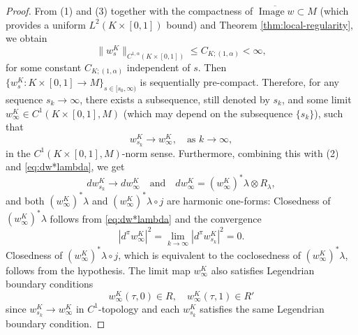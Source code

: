 \documentclass[reqno]{amsart}
\theoremstyle{theorem}
\theoremstyle{definition}
\numberwithin{equation}{section}
\def\Image{\operatorname{Image}}
\begin{document}
\begin{proof}
From (1) and (3) together with the compactness of $\overline{\Image w} \subset M$
(which provides a uniform $L^2(K\times [0,1])$ bound)
and Theorem \ref{thm:local-regularity}, we obtain
$$
\|w^K_s\|_{C^{1,\alpha}(K\times [0,1])}\leq C_{K;(1,\alpha)}<\infty,
$$
for some constant $C_{K;(1,\alpha)}$ independent of $s$.
Then
 $\{w^K_s:K\times [0,1]\to M\}_{s\in [s_0, \infty)}$ is sequentially pre-compact.
Therefore, for any sequence $s_k \to \infty$, there exists a subsequence, still denoted by $s_k$,
and some limit $w^K_\infty\in C^{1}(K\times [0,1], M)$ (which may depend on the subsequence $\{s_k\}$), such that
$$
w^K_{s_k}\to w^K_{\infty}, \quad \text {as } k\to \infty,
$$
in the $C^{1}(K\times [0,1], M)$-norm sense.
Furthermore, combining this with (2) and \eqref{eq:dw*lambda}, we get
$$
dw^K_{s_k}\to dw^K_{\infty} \quad \text{and} \quad dw^K_\infty=(w^K_\infty)^*\lambda\otimes R_\lambda,
$$
and both $(w^K_\infty)^*\lambda$ and $(w^K_\infty)^*\lambda\circ j$ are harmonic one-forms: Closedness of
$(w^K_\infty)^*\lambda$ follows from \eqref{eq:dw*lambda} and the convergence
$$
|d^\pi w^K_\infty|^2 = \lim_{k \to \infty}|d^\pi w^K_{s_k}|^2 = 0.
$$
Closedness of $(w^K_\infty)^*\lambda\circ j$, which is equivalent to the coclosedness of $(w^K_\infty)^*\lambda$,
follows from the hypothesis. The limit map $w_\infty^K$ also satisfies
Legendrian boundary conditions
$$
w_\infty^K(\tau,0) \in R, \quad w_\infty^K(\tau,1) \in R'
$$
since $w^K_{s_k} \to w^K_\infty$ in $C^1$-topology and each $w^K_{s_k}$ satisfies
the same Legendrian boundary condition.


\end{proof}
\end{document}
